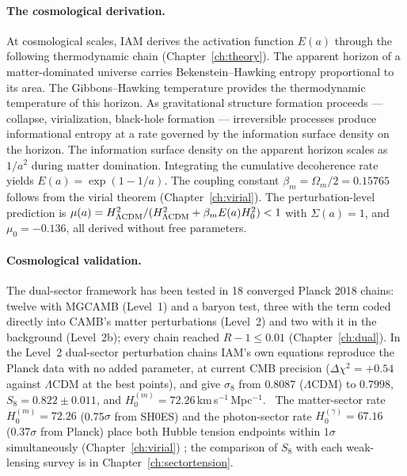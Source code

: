 \paragraph{The cosmological derivation.} At cosmological scales, IAM derives the activation function $E(a)$ through the following thermodynamic chain
(Chapter~\ref{ch:theory}). The apparent horizon of a matter-dominated universe carries Bekenstein--Hawking entropy proportional to its area. The
Gibbons--Hawking temperature provides the thermodynamic temperature of this horizon. As gravitational structure formation proceeds --- collapse,
virialization, black-hole formation --- irreversible processes produce informational entropy at a rate governed by the information surface density on the
horizon. The information surface density on the apparent horizon scales as $1/a^2$ during matter domination. Integrating the cumulative decoherence rate
yields $E(a)=\exp(1-1/a)$. The coupling constant $\beta_m=\Omega_m/2=0.15765$ follows from the virial theorem (Chapter~\ref{ch:virial}). The
perturbation-level prediction is $\mu(a)=H^2_{\Lambda\rm CDM}/(H^2_{\Lambda\rm CDM}+\beta_mE(a)H_0^2)<1$ with $\Sigma(a)=1$, and $\mu_0=-0.136$, all derived
without free parameters. \derived

\paragraph{Cosmological validation.} The dual-sector framework has been tested in 18 converged Planck 2018 chains: twelve with MGCAMB (Level~1) and a baryon
test, three with the term coded directly into CAMB's matter perturbations (Level~2) and two with it in the background (Level~2b); every chain reached
$R-1\le0.01$ (Chapter~\ref{ch:dual}). In the Level~2 dual-sector perturbation chains IAM's own equations reproduce the Planck data with no added parameter, at current CMB precision
($\Delta\chi^2=+0.54$ against $\Lambda$CDM at the best points), and give $\sigma_8$ from $0.8087$ ($\Lambda$CDM) to $0.7998$, $S_8=0.822\pm0.011$, and $H_0^{(m)}=72.26$\,km\,s$^{-1}$\,Mpc$^{-1}$. \measured\ The
matter-sector rate $H_0^{(m)}=72.26$ (0.75$\sigma$ from SH0ES) and the photon-sector rate $H_0^{(\gamma)}=67.16$ (0.37$\sigma$ from Planck) place both Hubble
tension endpoints within $1\sigma$ simultaneously (Chapter~\ref{ch:virial}) \calc; the comparison of $S_8$ with each weak-lensing survey is in
Chapter~\ref{ch:sectortension}.

